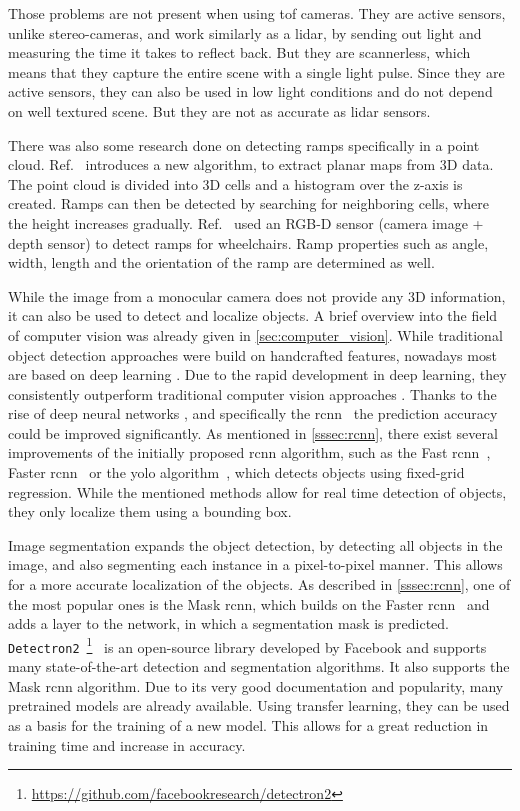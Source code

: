 Those problems are not present when using \gls{tof} cameras.
They are active sensors, unlike stereo-cameras, and work similarly as a \gls{lidar}, by sending out light and measuring the time it takes to reflect back.
But they are scannerless, which means that they capture the entire scene with a single light pulse.
Since they are active sensors, they can also be used in low light conditions and do not depend on well textured scene.
But they are not as accurate as \gls{lidar} sensors.

There was also some research done on detecting ramps specifically in a point cloud.
Ref.~\cite{Sakenas2007} introduces a new algorithm, to extract planar maps from 3D data.
The point cloud is divided into 3D cells and a histogram over the z-axis is created.
Ramps can then be detected by searching for neighboring cells, where the height increases gradually.
Ref.~\cite{Nejati2016} used an RGB-D sensor (camera image + depth sensor) to detect ramps for wheelchairs.
Ramp properties such as angle, width, length and the orientation of the ramp are determined as well.

While the image from a monocular camera does not provide any 3D information, it can also be used to detect and localize objects.
A brief overview into the field of computer vision was already given in \cref{sec:computer_vision}.
While traditional object detection approaches were build on handcrafted features, nowadays most are based on deep learning \cite{Zhao2019}.
Due to the rapid development in deep learning, they consistently outperform traditional computer vision approaches \cite{Mahony2019}.
Thanks to the rise of deep neural networks \cite{Krizhevsky2017}, and specifically the \gls{rcnn}~\cite{Girshick2014} the prediction accuracy could be improved significantly.
As mentioned in \cref{sssec:rcnn}, there exist several improvements of the initially proposed \gls{rcnn} algorithm, such as the Fast \gls{rcnn}~\cite{Girshick2015}, Faster \gls{rcnn}~\cite{Ren2017} or the \gls{yolo} algorithm~\cite{Redmon2016}, which detects objects using fixed-grid regression.
While the mentioned methods allow for real time detection of objects, they only localize them using a bounding box.

Image segmentation expands the object detection, by detecting all objects in the image, and also segmenting each instance in a pixel-to-pixel manner.
This allows for a more accurate localization of the objects.
As described in \cref{sssec:rcnn}, one of the most popular ones is the Mask \gls{rcnn}, which builds on the Faster \gls{rcnn}~\cite{Ren2017} and adds a layer to the network, in which a segmentation mask is predicted.
\texttt{Detectron2}~\footnote{\url{https://github.com/facebookresearch/detectron2}}~\cite{Wu2019} is an open-source library developed by Facebook and supports many state-of-the-art detection and segmentation algorithms.
It also supports the Mask \gls{rcnn} algorithm.
Due to its very good documentation and popularity, many pretrained models are already available.
Using transfer learning, they can be used as a basis for the training of a new model.
This allows for a great reduction in training time and increase in accuracy.



